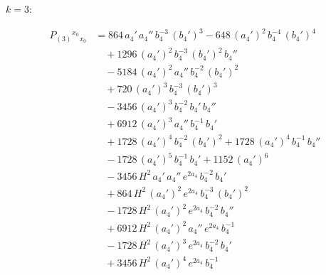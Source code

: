 \documentclass[11pt]{article}
\begin{document}
$k = 3$:

\[
\begin{aligned}
P_{(3)}{}^{x_0}{}_{x_0} &= 864\,a_4'\,a_4''\,b_4^{-3}\,(b_4')^{3} - 648\,(a_4')^{2}\,b_4^{-4}\,(b_4')^{4} \\
&\quad + 1296\,(a_4')^{2}\,b_4^{-3}\,(b_4')^{2}\,b_4'' \\
&\quad - 5184\,(a_4')^{2}\,a_4''\,b_4^{-2}\,(b_4')^{2} \\
&\quad + 720\,(a_4')^{3}\,b_4^{-3}\,(b_4')^{3} \\
&\quad - 3456\,(a_4')^{3}\,b_4^{-2}\,b_4'\,b_4'' \\
&\quad + 6912\,(a_4')^{3}\,a_4''\,b_4^{-1}\,b_4' \\
&\quad + 1728\,(a_4')^{4}\,b_4^{-2}\,(b_4')^{2} + 1728\,(a_4')^{4}\,b_4^{-1}\,b_4'' \\
&\quad - 1728\,(a_4')^{5}\,b_4^{-1}\,b_4' + 1152\,(a_4')^{6} \\
&\quad - 3456\,H^{2}\,a_4'\,a_4''\,e^{2 a_4}\,b_4^{-2}\,b_4' \\
&\quad + 864\,H^{2}\,(a_4')^{2}\,e^{2 a_4}\,b_4^{-3}\,(b_4')^{2} \\
&\quad - 1728\,H^{2}\,(a_4')^{2}\,e^{2 a_4}\,b_4^{-2}\,b_4'' \\
&\quad + 6912\,H^{2}\,(a_4')^{2}\,a_4''\,e^{2 a_4}\,b_4^{-1} \\
&\quad - 1728\,H^{2}\,(a_4')^{3}\,e^{2 a_4}\,b_4^{-2}\,b_4' \\
&\quad + 3456\,H^{2}\,(a_4')^{4}\,e^{2 a_4}\,b_4^{-1}
\end{aligned}
\]
\end{document}
